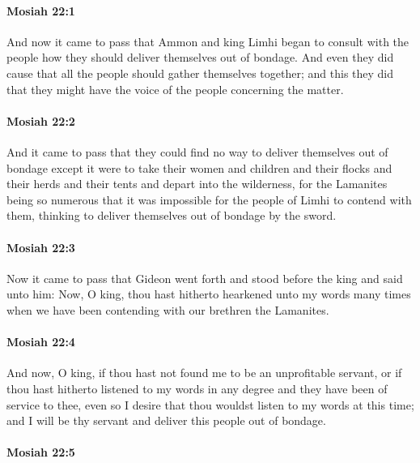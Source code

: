 		\paragraph{Mosiah 22:1} %
			\label{MOSIAH-22-1}

			And now it came to pass that
			Ammon and king Limhi began to consult with the people
			how they should deliver themselves out of bondage.
			And even they did cause
			that all the people should gather themselves together;
			and this they did that they might have the voice of the people concerning the matter.

		\paragraph{Mosiah 22:2} %
			\label{MOSIAH-22-2}

			And it came to pass that they could find no way
			to deliver themselves out of bondage
			except it were to take their women and children
			and their flocks and their herds and their tents
			and depart into the wilderness,
			for the Lamanites being so numerous
			that it was impossible for the people of Limhi to contend with them,
			thinking to deliver themselves out of bondage by the sword.

		\paragraph{Mosiah 22:3} %
			\label{MOSIAH-22-3}

			Now it came to pass that
			Gideon went forth and stood before the king and said unto him:
			Now, O king, thou hast hitherto hearkened unto my words many times
			when we have been contending with our brethren the Lamanites.

		\paragraph{Mosiah 22:4} %
			\label{MOSIAH-22-4}

			And now, O king, if thou hast not found me to be an unprofitable servant,
			or if thou hast hitherto listened to my words in any degree
			and they have been of service to thee,
			even so I desire that thou wouldst listen to my words at this time;
			and I will be thy servant and deliver this people out of bondage.

		\paragraph{Mosiah 22:5} %
			\label{MOSIAH-22-5}

